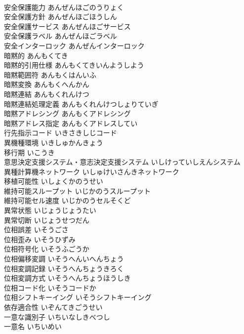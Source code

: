 \documentclass[8pt]{extreport}
\begin{document}
\begin{CJK}{UTF8}{min}
\\	安全保護能力	あんぜんほごのうりょく	
\\	安全保護方針	あんぜんほごほうしん	
\\	安全保護サービス	あんぜんほごサービス	
\\	安全保護ラベル	あんぜんほごラベル	
\\	安全インターロック	あんぜんインターロック	
\\	暗黙的	あんもくてき	
\\	暗黙的引用仕様	あんもくてきいんようしよう	
\\	暗黙範囲符	あんもくはんいふ	
\\	暗黙変換	あんもくへんかん	
\\	暗黙連結	あんもくれんけつ	
\\	暗黙連結処理定義	あんもくれんけつしょりていぎ	
\\	暗黙アドレシング	あんもくアドレシング	
\\	暗黙アドレス指定	あんもくアドレスしてい	
\\	行先指示コード	いきさきしじコード	
\\	異機種環境	いきしゅかんきょう	
\\	移行期	いこうき	
\\	意思決定支援システム・意志決定支援システム	いしけっていしえんシステム	
\\	異種計算機ネットワーク	いしゅけいさんきネットワーク	
\\	移植可能性	いしょくかのうせい	
\\	維持可能スループット	いじかのうスループット	
\\	維持可能セル速度	いじかのうセルそくど	
\\	異常状態	いじょうじょうたい	
\\	異常切断	いじょうせつだん	
\\	位相誤差	いそうごさ	
\\	位相歪み	いそうひずみ	
\\	位相符号化	いそうふごうか	
\\	位相偏移変調	いそうへんいへんちょう	
\\	位相変調記録	いそうへんちょうきろく	
\\	位相変調方式	いそうへんちょうほうしき	
\\	位相コード化	いそうコードか	
\\	位相シフトキーイング	いそうシフトキーイング	
\\	依存適合性	いぞんてきごうせい	
\\	一意な識別子	いちいなしきべつし	
\\	一意名	いちいめい	

\end{CJK}
\end{document}
